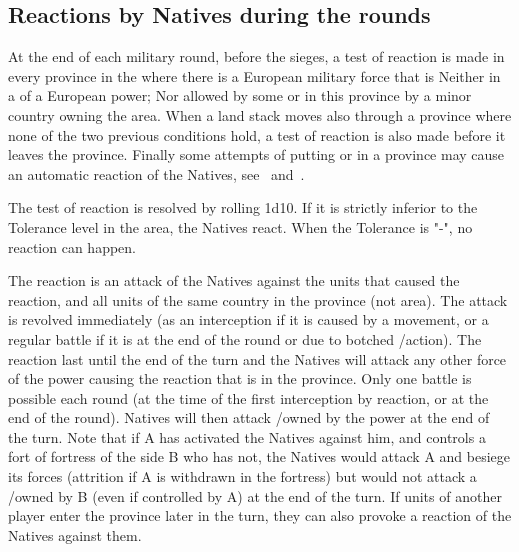 \subsection{Reactions by Natives during the rounds}
\aparag At the end of each military round, before the sieges, a test of
reaction is made in every province in the \ROTW where there is a
European military force that is
\bparag Neither in a \COL of a European power;
\bparag Nor allowed by some \dipFR or \dipAT in this province by a minor
country owning the area.
\bparag When a land stack moves also through a province where none of
the two previous conditions hold, a test of reaction is also made before
it leaves the province.
\bparag Finally some attempts of putting \TP or \COL in a province may
cause an automatic reaction of the Natives,
see~ 
and~.

\aparag The test of reaction is resolved by rolling 1d10. If it is
strictly inferior to the Tolerance level in the area, the Natives react.
When the Tolerance is "-", no reaction can happen.

\bparag The reaction is an attack of the Natives against the units that
caused the reaction, and all units of the same country in the province
(not area).
\bparag The attack is revolved immediately (as an interception if it is
caused by a movement, or a regular battle if it is at the end of the
round or due to botched \TP/\COL action).
\bparag
The reaction last until the end of the turn and the Natives will attack
any other force of the power causing the reaction that is in the
province. Only one battle is possible each round (at the time of the
first interception by reaction, or at the end of the round). Natives
will then attack \COL/\TP owned by the power at the end of the turn.
Note that if A has activated the Natives against him, and controls a
fort of fortress of the side B who has not, the Natives would attack A
and besiege its forces (attrition if A is withdrawn in the fortress) but
would not attack a \COL/\TP owned by B (even if controlled by A) at the
end of the turn.
\bparag If units of another player enter the province later in the turn, 
they can also provoke a reaction of the Natives against them. 
